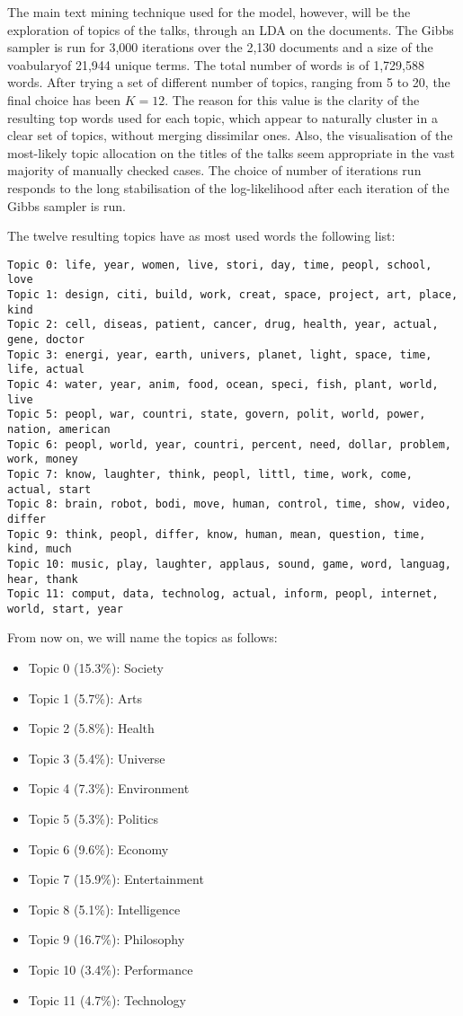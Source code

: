 \documentclass[a4paper, 11pt]{article} %
\begin{document}
The main text mining technique used for the model, however, will be the exploration of topics of the talks, through an LDA on the documents. The Gibbs sampler is run for 3,000 iterations over the 2,130 documents and a size of the voabularyof 21,944 unique terms. The total number of words is of 1,729,588 words. After trying a set of different number of topics, ranging from 5 to 20, the final choice has been $K=12$. The reason for this value is the clarity of the resulting top words used for each topic, which appear to naturally cluster in a clear set of topics, without merging dissimilar ones. Also, the visualisation of the most-likely topic allocation on the titles of the talks seem appropriate in the vast majority of manually checked cases. The choice of number of iterations run responds to the long stabilisation of the log-likelihood after each iteration of the Gibbs sampler is run.

The twelve resulting topics have as most used words the following list:

\begin{small}
\begin{verbatim}
Topic 0: life, year, women, live, stori, day, time, peopl, school, love
Topic 1: design, citi, build, work, creat, space, project, art, place, kind
Topic 2: cell, diseas, patient, cancer, drug, health, year, actual, gene, doctor
Topic 3: energi, year, earth, univers, planet, light, space, time, life, actual
Topic 4: water, year, anim, food, ocean, speci, fish, plant, world, live
Topic 5: peopl, war, countri, state, govern, polit, world, power, nation, american
Topic 6: peopl, world, year, countri, percent, need, dollar, problem, work, money
Topic 7: know, laughter, think, peopl, littl, time, work, come, actual, start
Topic 8: brain, robot, bodi, move, human, control, time, show, video, differ
Topic 9: think, peopl, differ, know, human, mean, question, time, kind, much
Topic 10: music, play, laughter, applaus, sound, game, word, languag, hear, thank
Topic 11: comput, data, technolog, actual, inform, peopl, internet, world, start, year
\end{verbatim}
\end{small}

From now on, we will name the topics as follows:

\begin{itemize}
\item Topic 0 (15.3\%): Society
\item Topic 1 (5.7\%): Arts
\item Topic 2 (5.8\%): Health
\item Topic 3 (5.4\%): Universe
\item Topic 4 (7.3\%): Environment
\item Topic 5 (5.3\%): Politics
\item Topic 6 (9.6\%): Economy
\item Topic 7 (15.9\%): Entertainment
\item Topic 8 (5.1\%): Intelligence
\item Topic 9 (16.7\%): Philosophy
\item Topic 10 (3.4\%): Performance
\item Topic 11 (4.7\%): Technology
\end{itemize}
\end{document}
